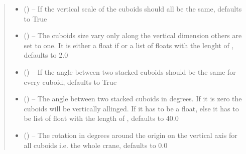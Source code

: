 \documentclass[letterpaper,10pt,english]{sphinxmanual}
\begin{document}
\begin{fulllineitems}
\begin{fulllineitems}
\begin{quote}
\begin{description}
\begin{itemize}
\item {} 
 (\sphinxstyleliteralemphasis{\sphinxupquote{, }}) -- If the vertical scale of the cuboids should all be the same, defaults to True

\item {} 
 (\sphinxstyleliteralemphasis{\sphinxupquote{, }}) -- The cuboids size vary only along the vertical dimension others are set to one. It is either a float if   or a list of floats with the lenght of , defaults to 2.0

\item {} 
 (\sphinxstyleliteralemphasis{\sphinxupquote{, }}) -- If the angle between two stacked cuboids should be the same for every cuboid, defaults to True

\item {} 
 (\sphinxstyleliteralemphasis{\sphinxupquote{, }}) -- The angle between two stacked cuboids in degrees. If it is zero the cuboids will be vertically allinged. If  it has to be a float, else it has to be list of float with the length of , defaults to 40.0

\item {} 
 (\sphinxstyleliteralemphasis{\sphinxupquote{, }}) -- The rotation in degrees around the origin on the vertical axis for all cuboids i.e. the whole crane, defaults to 0.0


\end{itemize}
\end{description}
\end{quote}
\end{fulllineitems}
\end{fulllineitems}
\end{document}
